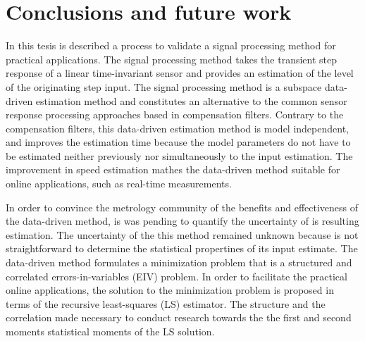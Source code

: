 \glsresetall

\chapter[Conclusions and future work]{Conclusions and \linebreak future work} \label{chap:concl}

\vfill{}



In this tesis is described a process to validate a signal processing method for practical applications.
The signal processing method takes the transient step response of a linear time-invariant sensor and provides an estimation of the level of the originating step input.
The signal processing method is a subspace data-driven estimation method and constitutes an alternative to the common sensor response processing approaches based in compensation filters.
Contrary to the compensation filters, this data-driven estimation method is model independent, and improves the estimation time because the model parameters do not have to be estimated neither previously nor simultaneously to the input estimation.
The improvement in speed estimation mathes the data-driven method suitable for online applications, such as real-time measurements.


In order to convince the metrology community of the benefits and effectiveness of the data-driven method, is was pending to quantify the uncertainty of is resulting estimation.
The uncertainty of the this method remained unknown because is not straightforward to determine the statistical propertines of its input estimate.
The data-driven method formulates a minimization problem that is a structured and correlated errors-in-variables (EIV) problem.
In order to facilitate the practical online applications, the solution to the minimization problem is proposed in terms of the recursive least-squares (LS) estimator.
The structure and the correlation made necessary to conduct research towards the the first and second moments statistical moments of the LS solution.


